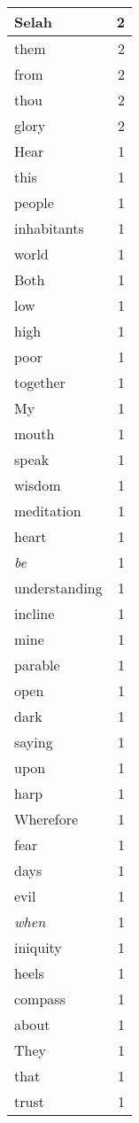 \begin{center}
\begin{longtable}{l|r}
Selah & 2 \\ \hline
them & 2 \\ \hline
from & 2 \\ \hline
thou & 2 \\ \hline
glory & 2 \\ \hline
Hear & 1 \\ \hline
this & 1 \\ \hline
people & 1 \\ \hline
inhabitants & 1 \\ \hline
world & 1 \\ \hline
Both & 1 \\ \hline
low & 1 \\ \hline
high & 1 \\ \hline
poor & 1 \\ \hline
together & 1 \\ \hline
My & 1 \\ \hline
mouth & 1 \\ \hline
speak & 1 \\ \hline
wisdom & 1 \\ \hline
meditation & 1 \\ \hline
heart & 1 \\ \hline
\emph{be} & 1 \\ \hline
understanding & 1 \\ \hline
incline & 1 \\ \hline
mine & 1 \\ \hline
parable & 1 \\ \hline
open & 1 \\ \hline
dark & 1 \\ \hline
saying & 1 \\ \hline
upon & 1 \\ \hline
harp & 1 \\ \hline
Wherefore & 1 \\ \hline
fear & 1 \\ \hline
days & 1 \\ \hline
evil & 1 \\ \hline
\emph{when} & 1 \\ \hline
iniquity & 1 \\ \hline
heels & 1 \\ \hline
compass & 1 \\ \hline
about & 1 \\ \hline
They & 1 \\ \hline
that & 1 \\ \hline
trust & 1 \\ \hline

\end{longtable}
\end{center}
